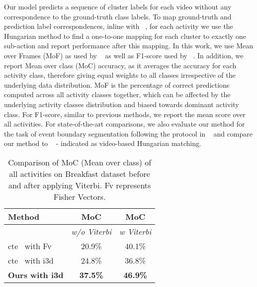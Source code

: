 \documentclass[final]{cvpr}
\begin{document}
 Our model predicts a sequence of cluster labels  for each video without any correspondence to the  ground-truth class labels. To map ground-truth and prediction label correspondences, inline with ~\cite{Alayrac16unsupervised, sener2018unsupervised, kukleva2019unsupervised}, for each activity we use the Hungarian method to find a one-to-one mapping for each cluster to exactly one sub-action and report performance after this mapping. 
In this work, we use Mean over Frames (MoF) as used by ~\cite{sener2018unsupervised,kukleva2019unsupervised} as well as F1-score used by ~\cite{Alayrac16unsupervised}. In addition,  we report Mean over class (MoC) accuracy,  as it averages the accuracy for each activity class, therefore giving equal weights to all classes irrespective of the underlying data distribution. MoF is the percentage of correct predictions computed across all activity classes together, which can be affected by the underlying activity classes distribution and biased towards dominant activity class. For F1-score, similar to previous methods, we  report the mean score over all activities. For state-of-the-art comparisons, we also evaluate our method for the task of event boundary segmentation following the protocol in ~\cite{aakur2019perceptual} and compare our method to ~\cite{aakur2019perceptual} - indicated as video-based Hungarian matching. 



\begin{table}[t]
\vspace{-0.2cm}
    \caption{{\small Comparison of MoC (Mean over class) of all activities on Breakfast dataset before and after applying Viterbi. {\sc Fv} represents Fisher Vectors.}}
    \label{tab:avg_acc}
    \centering
    \small
    \begin{tabular}{lcc}
        \toprule
        {\bf Method} & {\bf MoC} & {\bf MoC}\\
        \midrule
         & \textit{w/o Viterbi} & \textit{w Viterbi} \\
         \midrule
        {\sc cte}~\cite{kukleva2019unsupervised} with {\sc Fv} & 20.9\% & 40.1\% \\
        {\sc cte}~\cite{kukleva2019unsupervised} with {\sc i3d} & 24.8\% & 36.8\% \\
        \midrule
        \textbf{Ours with {\sc i3d}} & \textbf{37.5\%} &\textbf{46.9\%} \\
        \bottomrule
    \end{tabular}
\end{table}
\end{document}

